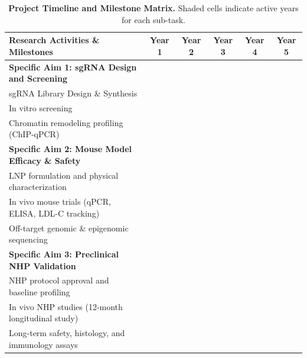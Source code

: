 \documentclass[11pt]{article}
\newcommand{\p}{\vspace{1.5mm}}
\begin{document}
\p
\begin{table}[h]
\centering
\caption{\textbf{Project Timeline and Milestone Matrix.} Shaded cells indicate active years for each sub-task.}
\label{tab:timeline}
\vspace{2.5mm}
\small
\begin{tabularx}{\linewidth}{@{} X c c c c c @{}}
\toprule
\textbf{Research Activities \& Milestones} & \textbf{Year 1} & \textbf{Year 2} & \textbf{Year 3} & \textbf{Year 4} & \textbf{Year 5} \\
\midrule
\rowcolor{medlightteal}
\textbf{Specific Aim 1: sgRNA Design and Screening} & & & & & \\
sgRNA Library Design \& Synthesis & \cellcolor{medaccent} & & & & \\
In vitro screening & \cellcolor{medaccent} & \cellcolor{medaccent} & & & \\
Chromatin remodeling profiling (ChIP-qPCR) & & \cellcolor{medaccent} & & & \\
\midrule
\rowcolor{medlightteal}
\textbf{Specific Aim 2: Mouse Model Efficacy \& Safety} & & & & & \\
LNP formulation and physical characterization & & \cellcolor{medaccent} & \cellcolor{medaccent} & & \\
In vivo mouse trials (qPCR, ELISA, LDL-C tracking) & & & \cellcolor{medaccent} & \cellcolor{medaccent} & \\
Off-target genomic \& epigenomic sequencing & & & \cellcolor{medaccent} & \cellcolor{medaccent} & \\
\midrule
\rowcolor{medlightteal}
\textbf{Specific Aim 3: Preclinical NHP Validation} & & & & & \\
NHP protocol approval and baseline profiling & & & & \cellcolor{medaccent} & \\
In vivo NHP studies (12-month longitudinal study) & & & & \cellcolor{medaccent} & \cellcolor{medaccent} \\
Long-term safety, histology, and immunology assays & & & & & \cellcolor{medaccent} \\
\bottomrule
\end{tabularx}
\end{table}

\p
\end{document}
